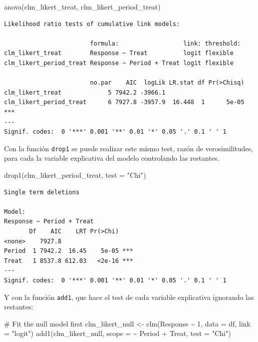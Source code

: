 \documentclass[
  letterpaper,
  DIV=11,
  numbers=noendperiod]{scrartcl}
\newenvironment{Shaded}{\begin{snugshade}}{\end{snugshade}}
\newcommand{\AttributeTok}[1]{\textcolor[rgb]{0.40,0.45,0.13}{#1}}
\newcommand{\CommentTok}[1]{\textcolor[rgb]{0.37,0.37,0.37}{#1}}
\newcommand{\DecValTok}[1]{\textcolor[rgb]{0.68,0.00,0.00}{#1}}
\newcommand{\FunctionTok}[1]{\textcolor[rgb]{0.28,0.35,0.67}{#1}}
\newcommand{\NormalTok}[1]{\textcolor[rgb]{0.00,0.23,0.31}{#1}}
\newcommand{\OtherTok}[1]{\textcolor[rgb]{0.00,0.23,0.31}{#1}}
\newcommand{\SpecialCharTok}[1]{\textcolor[rgb]{0.37,0.37,0.37}{#1}}
\newcommand{\StringTok}[1]{\textcolor[rgb]{0.13,0.47,0.30}{#1}}
\begin{document}
\begin{Shaded}
\begin{Highlighting}[]
\FunctionTok{anova}\NormalTok{(clm\_likert\_treat, clm\_likert\_period\_treat)}
\end{Highlighting}
\end{Shaded}

\begin{verbatim}
Likelihood ratio tests of cumulative link models:
 
                        formula:                  link: threshold:
clm_likert_treat        Response ~ Treat          logit flexible  
clm_likert_period_treat Response ~ Period + Treat logit flexible  

                        no.par    AIC  logLik LR.stat df Pr(>Chisq)    
clm_likert_treat             5 7942.2 -3966.1                          
clm_likert_period_treat      6 7927.8 -3957.9  16.448  1      5e-05 ***
---
Signif. codes:  0 '***' 0.001 '**' 0.01 '*' 0.05 '.' 0.1 ' ' 1
\end{verbatim}

Con la función \texttt{drop1} se puede realizar este mismo test, razón
de verosimilitudes, para cada la variable explicativa del modelo
controlando las restantes.

\begin{Shaded}
\begin{Highlighting}[]
\FunctionTok{drop1}\NormalTok{(clm\_likert\_period\_treat, }\AttributeTok{test =} \StringTok{"Chi"}\NormalTok{)}
\end{Highlighting}
\end{Shaded}

\begin{verbatim}
Single term deletions

Model:
Response ~ Period + Treat
       Df    AIC    LRT Pr(>Chi)    
<none>    7927.8                    
Period  1 7942.2  16.45    5e-05 ***
Treat   1 8537.8 612.03   <2e-16 ***
---
Signif. codes:  0 '***' 0.001 '**' 0.01 '*' 0.05 '.' 0.1 ' ' 1
\end{verbatim}

Y con la función \texttt{add1}, que hace el test de cada variable
explicativa ignorando las restantes:

\begin{Shaded}
\begin{Highlighting}[]
\CommentTok{\# Fit the null model first}
\NormalTok{clm\_likert\_null }\OtherTok{\textless{}{-}} \FunctionTok{clm}\NormalTok{(Response }\SpecialCharTok{\textasciitilde{}} \DecValTok{1}\NormalTok{, }\AttributeTok{data =}\NormalTok{ df, }\AttributeTok{link =} \StringTok{"logit"}\NormalTok{)}
\FunctionTok{add1}\NormalTok{(clm\_likert\_null, }\AttributeTok{scope =} \SpecialCharTok{\textasciitilde{}}\NormalTok{ Period }\SpecialCharTok{+}\NormalTok{ Treat, }\AttributeTok{test =} \StringTok{"Chi"}\NormalTok{)}
\end{Highlighting}
\end{Shaded}
\end{document}
